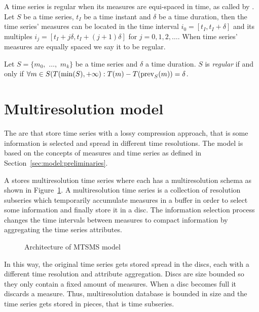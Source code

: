 A time series is regular when its measures are equi-spaced in time, as
called by \textcite{last:hetland}. Let $S$ be a time series, $t_I$ be a
time instant and $\delta$ be a time duration, then the time series'
measures can be located in the time interval $i_0=[t_I, t_I+\delta]$ and
its multiples $i_j=[t_I+j\delta, t_I+(j+1)\delta]$ for
$j=0,1,2,\ldots$. When time series' measures are equally spaced we say
it to be regular.

\begin{definition}
  Let $S=\{m_0,$ $\ldots,$ $m_k\}$ be a time series and $\delta$ a time
  duration. $S$ is \emph{regular} if and only if $\forall m \in
  S(T(\min(S),+\infty):T(m) - T(\operatorname*{prev}_S(m)) = \delta$.
\end{definition}





\section{Multiresolution model}
\label{sec:MTSMS}


The  are  that store time series with a lossy
compression approach, that is some information is selected and spread in
different time resolutions. The  model is based on the
concepts of measures and time series as defined in
Section~\ref{sec:model:preliminaries}.


A  stores multiresolution time series where each has a
multiresolution schema as shown in Figure~\ref{fig:model:mtsdb}. A
multiresolution time series is a collection of resolution subseries
which temporarily accumulate measures in a buffer in order to select
some information and finally store it in a disc. The information
selection process changes the time intervals between measures to
compact information by aggregating the time series attributes. 

\begin{figure}
  \centering
  
  \caption{Architecture of MTSMS model}
  \label{fig:model:mtsdb}
\end{figure}


In this way, the original time series gets stored spread in the discs,
each with a different time resolution and attribute aggregation.
Discs are size bounded so they only contain a fixed amount of
measures. When a disc becomes full it discards a measure. Thus,
multiresolution database is bounded in size and the time series gets
stored in pieces, that is time subseries.

